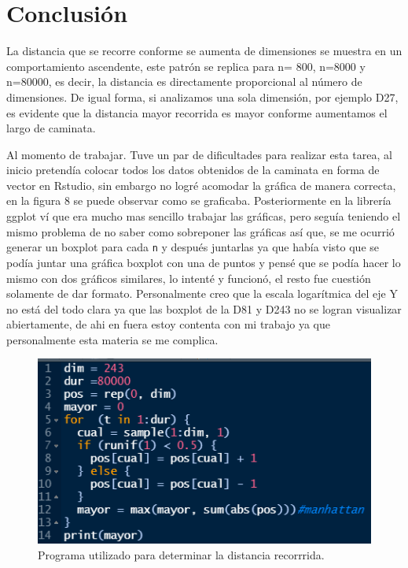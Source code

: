 \documentclass{article}
\begin{document}
\section{Conclusi\'on}

La distancia que se recorre conforme se aumenta de dimensiones se muestra en un comportamiento ascendente, este patr\'on se replica para n= 800, n=8000 y n=80000, es decir, la distancia es directamente proporcional al n\'umero de dimensiones.
De igual forma, si analizamos una sola dimensi\'on, por ejemplo D27, es evidente que la distancia mayor recorrida es mayor conforme aumentamos el largo de caminata.

Al momento de trabajar.
Tuve un par de dificultades para realizar esta tarea, al inicio pretend\'ia colocar todos los datos obtenidos de la caminata en forma de vector en Rstudio, sin embargo no logr\'e acomodar la gr\'afica de manera correcta, en la figura 8 se puede observar como se graficaba.
Posteriormente en la librer\'ia ggplot v\'i que era mucho mas sencillo trabajar las gr\'aficas, pero segu\'ia teniendo el mismo problema de no saber como sobreponer las gr\'aficas as\'i que, se me ocurri\'o generar un boxplot para cada \texttt{n} y despu\'es juntarlas ya que hab\'ia visto que se pod\'ia juntar una gr\'afica boxplot con una de puntos y pens\'e que se pod\'ia hacer lo mismo con dos gr\'aficos similares, lo intent\'e y funcion\'o, el resto fue cuesti\'on solamente de dar formato.
Personalmente creo que la escala logar\'itmica del eje Y no est\'a del todo clara ya que las boxplot de la D81 y D243 no se logran visualizar abiertamente, de ahi en fuera estoy contenta con mi trabajo ya que personalmente esta materia se me complica.




\begin{figure} %
    \centering
    \includegraphics[width=150mm]{figura 1.PNG} %
    \caption{Programa utilizado para determinar la distancia recorrrida. }
    \label{figura 1}
\end{figure}
\end{document}

